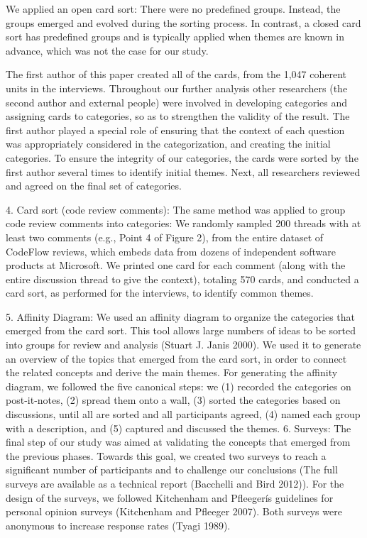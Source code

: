 \documentclass[conference]{IEEEtran}
\begin{document}
We applied an open card sort: There were no predefined groups. Instead, the
groups emerged and evolved during the sorting process. In contrast, a closed
card sort has predefined groups and is typically applied when themes are known
in advance, which was not the case for our study.

The first author of this paper created all of the cards, from the 1,047
coherent units in the interviews. Throughout our further analysis other
researchers (the second author and external people) were involved in developing
categories and assigning cards to categories, so as to strengthen the validity
of the result. The first author played a special role of ensuring that the
context of each question was appropriately considered in the categorization,
and creating the initial categories. To ensure the integrity of our categories,
the cards were sorted by the first author several times to identify initial
themes. Next, all researchers reviewed and agreed on the final set of
categories.

4. Card sort (code review comments): The same method was applied to group code
review comments into categories: We randomly sampled 200 threads with at least
two comments (e.g., Point 4 of Figure 2), from the entire dataset of CodeFlow
reviews, which embeds data from dozens of independent software products at
Microsoft. We printed one card for each comment (along with the entire
discussion thread to give the context), totaling 570 cards, and conducted a
card sort, as performed for the interviews, to identify common themes.

5. Affinity Diagram: We used an affinity diagram to organize the categories
that emerged from the card sort. This tool allows large numbers of ideas to be
sorted into groups for review and analysis (Stuart J. Janis 2000). We used it
to generate an overview of the topics that emerged from the card sort, in order
to connect the related concepts and derive the main themes. For generating the
affinity diagram, we followed the five canonical steps: we (1) recorded the
categories on post-it-notes, (2) spread them onto a wall, (3) sorted the
categories based on discussions, until all are sorted and all participants
agreed, (4) named each group with a description, and (5) captured and discussed
the themes. 6. Surveys: The final step of our study was aimed at validating the
concepts that emerged from the previous phases. Towards this goal, we created
two surveys to reach a significant number of participants and to challenge our
conclusions (The full surveys are available as a technical report (Bacchelli
and Bird 2012)). For the design of the surveys, we followed Kitchenham and
Pfleegerís guidelines for personal opinion surveys (Kitchenham and Pfleeger
2007). Both surveys were anonymous to increase response rates (Tyagi 1989).
\end{document}

